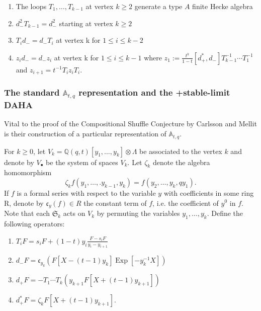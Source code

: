 \documentclass[ALCO,Unicode]{cedram}
\DeclareMathOperator{\EXP}{\mathrm{Exp}}
\begin{document}
\begin{center}

\begin{enumerate}
    \item The loops $T_1,\ldots,T_{k-1}$ at vertex $k\geq 2$ generate a type $A$ finite Hecke algebra 
    \item $d_{-}^2T_{k-1} = d_{-}^2$ starting at vertex $k \geq 2$
    \item  $T_id_{-} = d_{-}T_i$ at vertex k for $1\leq i\leq k-2$
    \item $z_id_{-}= d_{-}z_i$ at vertex k for $1\leq i \leq k-1$ where $z_1 := \frac{t^k}{1-t}[d_{+}^{*},d_{-}]T_{k-1}^{-1}\cdots T_{1}^{-1}$ and $z_{i+1} = t^{-1}T_iz_iT_i.$
 \end{enumerate}

 \end{center}


\subsubsection{The standard $\mathbb{A}_{t,q}$ representation and the +stable-limit DAHA}

Vital to the proof of the Compositional Shuffle Conjecture by Carlsson and Mellit \cite{CM_2015} is their construction of a particular representation of $\mathbb{A}_{t,q}$. 


\begin{defi}[\cite{CM_2015}]\label{A qt defns}
    For $k \geq 0$, let $V_k = \mathbb{Q}(q,t)[y_1,\ldots,y_k]\otimes \Lambda$ be associated to the vertex $k$ and denote by $V_{\bullet}$ be the system of spaces $V_k$. Let $\zeta_k$ denote the algebra homomorphism $$\zeta_kf(y_1,\ldots,.y_{k-1},y_k) = f(y_2,\ldots,y_k,qy_1).$$ If $f$ is a formal series with respect to the variable $y$ with coefficients in some ring R, denote by $\mathfrak{c}_{y}(f) \in R$ the constant term of $f$, i.e. the coefficient of $y^{0}$ in $f$. Note that each $\mathfrak{S}_k$ acts on $V_k$ by permuting the variables $y_1,\ldots,y_k.$ Define the following operators:
\begin{enumerate}
    \item $T_iF = s_iF + (1-t)y_i \frac{F-s_iF}{y_i-y_{i+1}}$
    \item $d_{-}F = \mathfrak{c}_{y_k}(F[X-(t-1)y_k]\EXP[-y_k^{-1}X])$
    \item $d_{+}F = -T_1\cdots T_k (y_{k+1}F[X+(t-1)y_{k+1}])$
    \item $d_{+}^{*}F = \zeta_kF[X+(t-1)y_{k+1}].$
\end{enumerate}
\end{defi}
\end{document}
